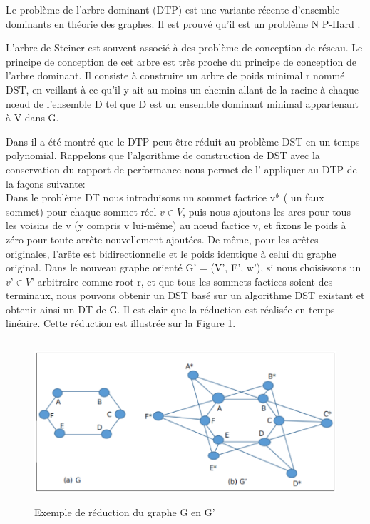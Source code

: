 Le problème de l’arbre dominant (DTP) est une variante récente d’ensemble dominants en théorie des graphes. Il est prouvé qu'il est un problème N P-Hard \cite{shin2010approximation,zhang2008new}.

L’arbre de Steiner est souvent associé à des problème de conception de réseau. Le principe de conception de cet arbre est très proche du principe de conception de l’arbre dominant. Il consiste à construire un arbre de poids minimal r nommé DST, en veillant à ce qu'il y ait au moins un chemin allant de la racine à chaque nœud de l'ensemble D tel que D est un ensemble dominant minimal appartenant à V dans G.

Dans \cite{shin2010approximation} il a été montré que le DTP peut être réduit au problème DST en un temps polynomial. Rappelons que l’algorithme de construction de DST avec la conservation du rapport de performance nous permet de l’ appliquer au DTP de la façons suivante:\\
Dans le problème DT nous introduisons un sommet factrice v* ( un faux sommet) pour chaque sommet réel $v \in V$,  puis nous ajoutons les arcs pour tous les voisins de v (y compris v lui-même) au nœud factice v, et fixons le poids à zéro pour toute arrête nouvellement ajoutées. De même, pour les arêtes originales, l’arête est bidirectionnelle et le poids identique à celui du graphe original. Dans le nouveau graphe orienté G’ = (V’, E’, w’), si nous choisissons un $v’ \in V’$ arbitraire comme root r, et que tous les sommets factices soient des terminaux, nous pouvons obtenir un DST basé sur un algorithme DST existant \cite{zhang2008new} et obtenir ainsi un DT de G. Il est clair que la réduction est réalisée en temps linéaire. Cette réduction est illustrée sur la Figure \ref{fig:31}.\\

\begin{figure}[H]
	\centering
	\includegraphics[width=15cm,height=6cm]{Chap3/1.png}
	\caption{Exemple de réduction du graphe G en G’}
	\label{fig:31}
\end{figure}

